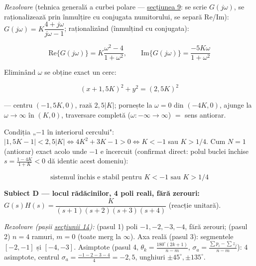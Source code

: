 \documentclass[10pt,a4paper]{article}
\begin{document}
\textit{Rezolvare} (tehnica generală a curbei polare — \hyperref[sec:9]{secțiunea 9}: se scrie $G(j\omega)$, se raționalizează prin înmulțire cu conjugata numitorului, se separă Re/Im): $G(j\omega)=K\dfrac{4+j\omega}{j\omega-1}$; raționalizând (înmulțind cu conjugata):
\begin{keyeq}\color{red!65!black}
$$\mathrm{Re}\{G(j\omega)\}=K\dfrac{\omega^2-4}{1+\omega^2},\qquad \mathrm{Im}\{G(j\omega)\}=\dfrac{-5K\omega}{1+\omega^2}$$
\end{keyeq}
Eliminând $\omega$ se obține exact un cerc:
\begin{keyeq}\color{red!65!black}
$$(x+1{,}5K)^2+y^2=(2{,}5K)^2$$
\end{keyeq}
— centru $(-1{,}5K,0)$, rază $2{,}5|K|$; pornește la $\omega{=}0$ din $(-4K,0)$, ajunge la $\omega\to\infty$ în $(K,0)$, traversare completă ($\omega{:}-\infty\to\infty$) $=$ sens antiorar.

Condiția „$-1$ în interiorul cercului": $|1{,}5K-1|<2{,}5|K|\Leftrightarrow 4K^2{+}3K{-}1>0\Leftrightarrow K<-1$ sau $K>1/4$. Cum $N{=}1$ (antiorar) exact acolo unde $-1$ e încercuit (confirmat direct: polul buclei închise $s{=}\tfrac{1-4K}{1+K}<0$ dă identic acest domeniu):
\begin{keyeq}\color{red!65!black}
$$\text{sistemul închis e stabil pentru } K<-1 \text{ sau } K>1/4$$
\end{keyeq}

\begin{center}
\end{center}

\textbf{Subiect D — locul rădăcinilor, 4 poli reali, fără zerouri:} $G(s)H(s)=\dfrac{K}{(s+1)(s+2)(s+3)(s+4)}$ (reacție unitară).

\textit{Rezolvare (pașii \hyperref[sec:14]{secțiunii 14}):} (pasul 1) poli $-1,-2,-3,-4$, fără zerouri; (pasul 2) $n{=}4$ ramuri, $m{=}0$ (toate merg la $\infty$). Axa reală (pasul 3): segmentele $[-2,-1]$ și $[-4,-3]$. Asimptote (pasul 4, $\theta_k{=}\tfrac{180^\circ(2k+1)}{n-m}$, $\sigma_a{=}\tfrac{\sum p_i-\sum z_j}{n-m}$): $4$ asimptote, centrul $\sigma_a{=}\tfrac{-1-2-3-4}{4}{=}-2{,}5$, unghiuri $\pm45^\circ,\pm135^\circ$.
\end{document}
